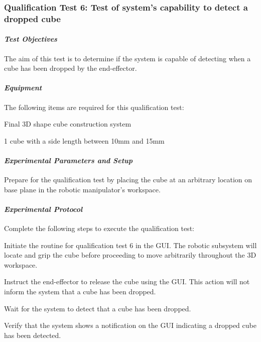 \subsubsection*{Qualification Test 6: Test of system's capability to detect a dropped cube}

\paragraph{\textit{Test Objectives}}

The aim of this test is to determine if the system is capable of detecting when a cube has been dropped by the end-effector.

\paragraph{\textit{Equipment}}

The following items are required for this qualification test:

\begin{compactitem}
    \item Final 3D shape cube construction system
    \item 1 cube with a side length between 10mm and 15mm
\end{compactitem}

\paragraph{\textit{Experimental Parameters and Setup}}

Prepare for the qualification test by placing the cube at an arbitrary location on base plane in the robotic manipulator's workspace.

\paragraph{\textit{Experimental Protocol}}

Complete the following steps to execute the qualification test:

\begin{compactenum}
    \item Initiate the routine for qualification test 6 in the GUI. The robotic subsystem will locate and grip the cube before proceeding to move arbitrarily throughout the 3D workspace.
    \item Instruct the end-effector to release the cube using the GUI. This action will not inform the system that a cube has been dropped.
    \item Wait for the system to detect that a cube has been dropped.
    \item Verify that the system shows a notification on the GUI indicating a dropped cube has been detected.
\end{compactenum}

